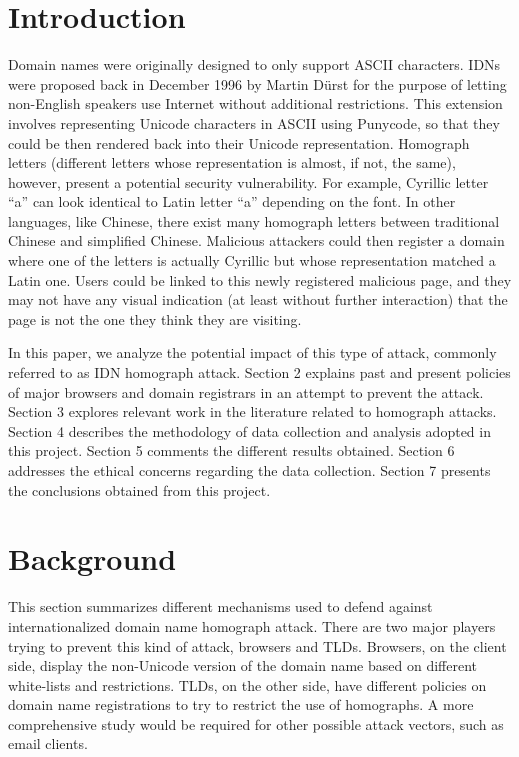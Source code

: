 \documentclass[letterpaper,twocolumn,10pt]{article}
\begin{document}
\section{Introduction}
Domain names were originally designed to only support ASCII characters.
IDNs were proposed back in December 1996 by Martin D\"{u}rst for the purpose of letting non-English speakers use Internet without additional restrictions.
This extension involves representing Unicode characters in ASCII using Punycode, so that they could be then rendered back into their Unicode representation.
Homograph letters (different letters whose representation is almost, if not, the same), however, present a potential security vulnerability.
For example, Cyrillic letter ``a'' can look identical to Latin letter ``a'' depending on the font.
In other languages, like Chinese, there exist many homograph letters between traditional Chinese and simplified Chinese.
Malicious attackers could then register a domain where one of the letters is actually Cyrillic but whose representation matched a Latin one.
Users could be linked to this newly registered malicious page, and they may not have any visual indication (at least without further interaction) that the page is not the one they think they are visiting.

In this paper, we analyze the potential impact of this type of attack, commonly referred to as IDN homograph attack.
Section 2 explains past and present policies of major browsers and domain registrars in an attempt to prevent the attack.
Section 3 explores relevant work in the literature related to homograph attacks.
Section 4 describes the methodology of data collection and analysis adopted in this project.
Section 5 comments the different results obtained.
Section 6 addresses the ethical concerns regarding the data collection.
Section 7 presents the conclusions obtained from this project.

\section{Background}
This section summarizes different mechanisms used to defend against internationalized domain name homograph attack.
There are two major players trying to prevent this kind of attack, browsers and TLDs.
Browsers, on the client side, display the non-Unicode version of the domain name based on different white-lists and restrictions.
TLDs, on the other side, have different policies on domain name registrations to try to restrict the use of homographs.
A more comprehensive study would be required for other possible attack vectors, such as email clients.
\end{document}
